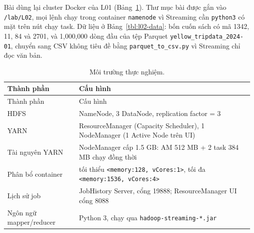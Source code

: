 \documentclass[
  12pt,
  a4paper,
]{article}
\begin{document}
Bài dùng lại cluster Docker của L01 (Bảng~\ref{tbl:l02-env}). Thư mục
bài được gắn vào \texttt{/lab/L02}, mọi lệnh chạy trong container
\texttt{namenode} vì Streaming cần \texttt{python3} có mặt trên nút chạy
task. Dữ liệu ở Bảng~\ref{tbl:l02-data}: bốn cuốn sách có mã 1342, 11,
84 và 2701, và 1,000,000 dòng đầu của tệp Parquet
\texttt{yellow\_}\allowbreak{}\texttt{tripdata\_}\allowbreak{}\texttt{2024-01}\allowbreak{},
chuyển sang CSV không tiêu đề bằng
\texttt{parquet\_}\allowbreak{}\texttt{to\_}\allowbreak{}\texttt{csv.}\allowbreak{}\texttt{py}\allowbreak{}
vì Streaming chỉ đọc văn bản.

\begin{longtable}[]{@{}
  >{\raggedright\arraybackslash}p{}
  >{\raggedright\arraybackslash}p{}@{}}
\caption{\label{tbl:l02-env}Môi trường thực nghiệm.}\tabularnewline
\toprule\noalign{}
\begin{minipage}[b]{\linewidth}\raggedright
Thành phần
\end{minipage} & \begin{minipage}[b]{\linewidth}\raggedright
Cấu hình
\end{minipage} \\
\midrule\noalign{}
\endfirsthead
\toprule\noalign{}
\begin{minipage}[b]{\linewidth}\raggedright
Thành phần
\end{minipage} & \begin{minipage}[b]{\linewidth}\raggedright
Cấu hình
\end{minipage} \\
\midrule\noalign{}
\endhead
\bottomrule\noalign{}
\endlastfoot
HDFS & 1 NameNode, 3 DataNode, replication factor = 3 \\
YARN & 1 ResourceManager (Capacity Scheduler), 1 NodeManager (1 Active
Node trên UI) \\
Tài nguyên YARN & NodeManager cấp 1.5 GB: AM 512 MB + 2 task 384 MB chạy
đồng thời \\
Phân bổ container & tối thiểu
\texttt{\textless{}memory:}\allowbreak{}\texttt{128,}\allowbreak{}\texttt{\ vCores:}\allowbreak{}\texttt{1\textgreater{}}\allowbreak{},
tối đa
\texttt{\textless{}memory:}\allowbreak{}\texttt{1536,}\allowbreak{}\texttt{\ vCores:}\allowbreak{}\texttt{4\textgreater{}}\allowbreak{} \\
Lịch sử job & JobHistory Server, cổng 19888; ResourceManager UI cổng
8088 \\
Ngôn ngữ mapper/reducer & Python 3, chạy qua
\texttt{hadoop-streaming-*.}\allowbreak{}\texttt{jar}\allowbreak{} \\
\end{longtable}
\end{document}
